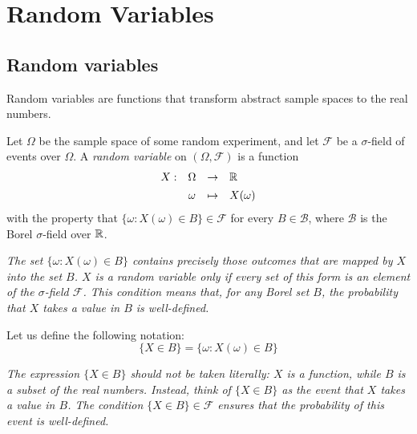 \chapter{Random Variables}\label{chap:random_variables}

\section{Random variables}
Random variables are functions that transform abstract sample spaces to the real numbers.

\begin{definition}
Let $\Omega$ be the sample space of some random experiment, and let $\mathcal{F}$ be a $\sigma$-field of events over $\Omega$.
A \emph{random variable} on $(\Omega,\mathcal{F})$ is a function 
\[
\begin{array}{rccl}
	X:	& \Omega	& \to		& \mathbb{R} \\[1ex]
		& \omega	& \mapsto	& X(\omega)
\end{array}
\]
with the property that $\{\omega: X(\omega)\in B\}\in\mathcal{F}$ for every $B\in\mathcal{B}$, where $\mathcal{B}$ is the Borel $\sigma$-field over $\mathbb{R}$.
\end{definition}

\begin{remark}
\bit
\it The set $\{\omega: X(\omega)\in B\}$ contains precisely those outcomes that are mapped by $X$ into the set $B$.
\it $X$ is a random variable only if every set of this form is an element of the $\sigma$-field $\mathcal{F}$.
\it This condition means that, for any Borel set $B$, the probability that $X$ takes a value in $B$ is well-defined.
\eit
\end{remark}

Let us define the following notation:
\[
\{X\in B\} = \{\omega: X(\omega)\in B\}
\]


\bit
\it The expression $\{X\in B\}$ should not be taken literally: $X$ is a function, while $B$ is a subset of the real numbers. 
\it Instead, think of $\{X\in B\}$ as the event that $X$ takes a value in $B$.
\it The condition $\{X\in B\}\in\mathcal{F}$ ensures that the probability of this event is well-defined.
\eit

